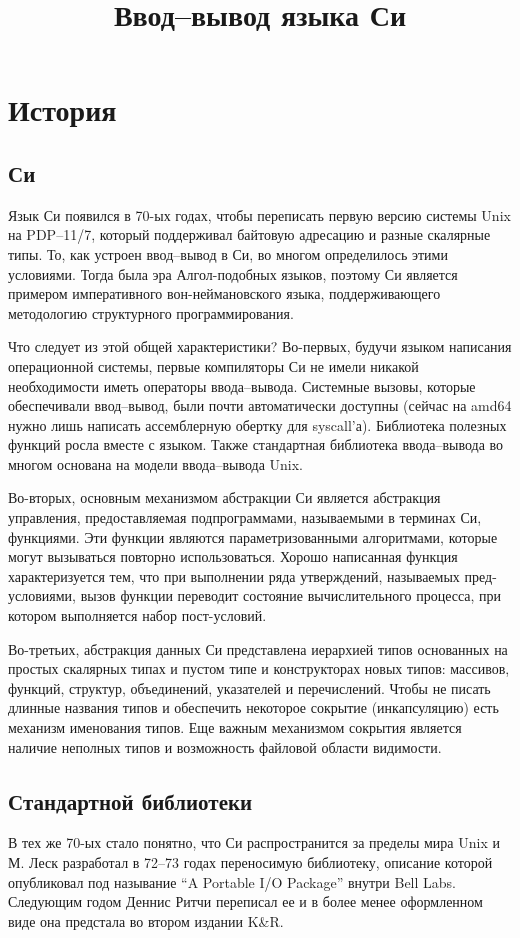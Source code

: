 \documentclass{article}
\title{Ввод--вывод языка Си}
\begin{document}
\maketitle
\lstset{language=C}

\section{История}
\subsection{Си}
Язык Си появился в 70-ых годах, чтобы переписать первую версию системы
Unix на PDP--11/7, который поддерживал байтовую адресацию и разные
скалярные типы.  То, как устроен ввод--вывод в Си, во многом
определилось этими условиями.  Тогда была эра Алгол-подобных языков,
поэтому Си является примером императивного вон-неймановского языка,
поддерживающего методологию структурного программирования.

Что следует из этой общей характеристики? Во-первых, будучи языком
написания операционной системы, первые компиляторы Си не имели никакой
необходимости иметь операторы ввода--вывода.  Системные вызовы,
которые обеспечивали ввод--вывод, были почти автоматически доступны
(сейчас на amd64 нужно лишь написать ассемблерную обертку для
syscall'а).  Библиотека полезных функций росла вместе с языком.
Также стандартная библиотека ввода--вывода во многом основана на модели
ввода--вывода Unix.


Во-вторых, основным механизмом абстракции Си является абстракция
управления, предоставляемая подпрограммами, называемыми в терминах Си,
функциями. Эти функции являются параметризованными алгоритмами,
которые могут вызываться повторно использоваться. Хорошо написанная
функция характеризуется тем, что при выполнении ряда утверждений,
называемых пред-условиями, вызов функции переводит состояние
вычислительного процесса, при котором выполняется набор пост-условий.


Во-третьих, абстракция данных Си представлена иерархией типов
основанных на простых скалярных типах и пустом типе и конструкторах
новых типов: массивов, функций, структур, объединений, указателей и
перечислений. Чтобы не писать длинные названия типов и обеспечить
некоторое сокрытие (инкапсуляцию) есть механизм именования типов. Еще
важным механизмом сокрытия является наличие неполных типов и
возможность файловой области видимости.

\subsection{Стандартной библиотеки}
В тех же 70-ых стало понятно, что Си распространится за пределы мира
Unix и М. Леск разработал в 72--73 годах переносимую библиотеку,
описание которой опубликовал под называние ``A Portable I/O Package''
внутри Bell Labs. Следующим годом Деннис Ритчи переписал ее и в более
менее оформленном виде она предстала во втором издании K\&R.
\end{document}
